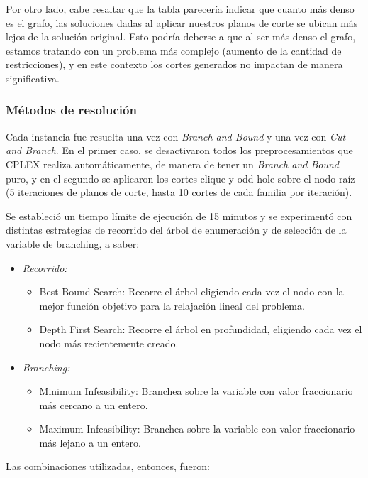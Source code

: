 \documentclass[a4paper]{article}
\begin{document}
Por otro lado, cabe resaltar que la tabla parecería indicar que cuanto más denso es el grafo, las soluciones dadas al aplicar nuestros planos de corte se ubican más lejos de la solución original. Esto podría deberse a que al ser más denso el grafo, estamos tratando con un problema más complejo (aumento de la cantidad de restricciones), y en este contexto los cortes generados no impactan de manera significativa.


\subsubsection{Métodos de resolución}

Cada instancia fue resuelta una vez con {\it Branch and Bound} y una vez con {\it Cut and Branch}. En el primer caso, se desactivaron todos los preprocesamientos que CPLEX realiza automáticamente, de manera de tener un {\it Branch and Bound} puro, y en el segundo se aplicaron los cortes clique y odd-hole sobre el nodo raíz (5 iteraciones de planos de corte, hasta 10 cortes de cada familia por iteración). 

Se estableció un tiempo límite de ejecución de 15 minutos y se experimentó con distintas estrategias de recorrido del árbol de enumeración y de selección de la variable de branching, a saber:

\begin{itemize}
	\item {\it Recorrido:}
	\begin{itemize}
		\item Best Bound Search: Recorre el árbol eligiendo cada vez el nodo con la mejor función objetivo para la relajación lineal del problema.
		\item Depth First Search: Recorre el árbol en profundidad, eligiendo cada vez el nodo más recientemente creado.
	\end{itemize}
	\item {\it Branching:}
	\begin{itemize}
		\item Minimum Infeasibility: Branchea sobre la variable con valor fraccionario más cercano a un entero.
		\item Maximum Infeasibility: Branchea sobre la variable con valor fraccionario más lejano a un entero.
	\end{itemize}
\end{itemize}

Las combinaciones utilizadas, entonces, fueron:
\end{document}
